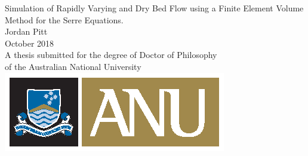 \begin{titlepage}
\begin{center}

\vspace*{\fill} \Huge
                        Simulation of Rapidly Varying and Dry Bed Flow 
                        using a Finite Element Volume Method for the 
                        Serre Equations.
\\
\vfill\vfill\Large
                          Jordan Pitt
\\
\vfill\vfill
                          October 2018
\\
\vfill\vfill \normalsize
         A thesis submitted for the degree of Doctor of Philosophy\\
         of the Australian National University
\vfill
         \includegraphics{ANU.eps}

\end{center}

\end{titlepage}
